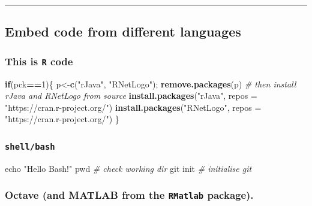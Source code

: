 \documentclass[portrait]{article}
\newenvironment{Shaded}{\begin{snugshade}}{\end{snugshade}}
\newcommand{\KeywordTok}[1]{\textcolor[rgb]{0.13,0.29,0.53}{\textbf{#1}}}
\newcommand{\DataTypeTok}[1]{\textcolor[rgb]{0.13,0.29,0.53}{#1}}
\newcommand{\DecValTok}[1]{\textcolor[rgb]{0.00,0.00,0.81}{#1}}
\newcommand{\StringTok}[1]{\textcolor[rgb]{0.31,0.60,0.02}{#1}}
\newcommand{\CommentTok}[1]{\textcolor[rgb]{0.56,0.35,0.01}{\textit{#1}}}
\newcommand{\FunctionTok}[1]{\textcolor[rgb]{0.00,0.00,0.00}{#1}}
\newcommand{\ControlFlowTok}[1]{\textcolor[rgb]{0.13,0.29,0.53}{\textbf{#1}}}
\newcommand{\OperatorTok}[1]{\textcolor[rgb]{0.81,0.36,0.00}{\textbf{#1}}}
\newcommand{\BuiltInTok}[1]{#1}
\newcommand{\NormalTok}[1]{#1}
\begin{document}
\begin{center}\rule{0.5\linewidth}{\linethickness}\end{center}

\subsection{Embed code from different
languages}\label{embed-code-from-different-languages}

\subsubsection{\texorpdfstring{This is \texttt{R}
code}{This is R code}}\label{this-is-r-code}

\begin{Shaded}
\begin{Highlighting}[]
\ControlFlowTok{if}\NormalTok{(pck}\OperatorTok{==}\DecValTok{1}\NormalTok{)\{}
\NormalTok{  p<-}\KeywordTok{c}\NormalTok{(}\StringTok{"rJava"}\NormalTok{, }\StringTok{"RNetLogo"}\NormalTok{); }\KeywordTok{remove.packages}\NormalTok{(p)}
  \CommentTok{# then install rJava and RNetLogo from source}
  \KeywordTok{install.packages}\NormalTok{(}\StringTok{"rJava"}\NormalTok{, }\DataTypeTok{repos =} \StringTok{"https://cran.r-project.org/"}\NormalTok{)}
  \KeywordTok{install.packages}\NormalTok{(}\StringTok{"RNetLogo"}\NormalTok{, }\DataTypeTok{repos =} \StringTok{"https://cran.r-project.org/"}\NormalTok{)}
\NormalTok{\}}
\end{Highlighting}
\end{Shaded}

\subsubsection{\texorpdfstring{\texttt{shell/bash}}{shell/bash}}\label{shellbash}

\begin{Shaded}
\begin{Highlighting}[]
\BuiltInTok{echo} \StringTok{"Hello Bash!"}  
\BuiltInTok{pwd} \CommentTok{# check working dir}
\FunctionTok{git}\NormalTok{ init }\CommentTok{# initialise git}
\end{Highlighting}
\end{Shaded}

\subsubsection{\texorpdfstring{Octave (and MATLAB from the
\texttt{RMatlab}
package).}{Octave (and MATLAB from the RMatlab package).}}\label{octave-and-matlab-from-the-rmatlab-package.}
\end{document}
